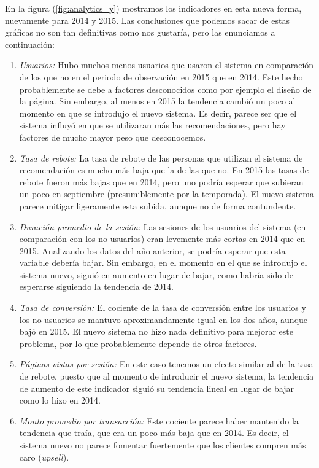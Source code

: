 \documentclass[12pt]{report}
\begin{document}
En la figura (\ref{fig:analytics_y}) mostramos los indicadores en esta nueva forma, nuevamente para 2014 y 2015. Las conclusiones que podemos sacar de estas gráficas no son tan definitivas como nos gustaría, pero las enunciamos a continuación:
\begin{enumerate}
	\item \emph{Usuarios:} Hubo muchos menos usuarios que usaron el sistema en comparación de los que no en el periodo de observación en 2015 que en 2014. Este hecho probablemente se debe a factores desconocidos como por ejemplo el diseño de la página. Sin embargo, al menos en 2015 la tendencia cambió un poco al momento en que se introdujo el nuevo sistema. Es decir, parece ser que el sistema influyó en que se utilizaran más las recomendaciones, pero hay factores de mucho mayor peso que desconocemos.
	\item \emph{Tasa de rebote:} La tasa de rebote de las personas que utilizan el sistema de recomendación es mucho más baja que la de las que no. En 2015 las tasas de rebote fueron más bajas que en 2014, pero uno podría esperar que subieran un poco en septiembre (presumiblemente por la temporada). El nuevo sistema parece mitigar ligeramente esta subida, aunque no de forma contundente.
	\item \emph{Duración promedio de la sesión:} Las sesiones de los usuarios del sistema (en comparación con los no-usuarios) eran levemente más cortas en 2014 que en 2015. Analizando los datos del año anterior, se podría esperar que esta variable debería bajar. Sin embargo, en el momento en el que se introdujo el sistema nuevo, siguió en aumento en lugar de bajar, como habría sido de esperarse siguiendo la tendencia de 2014.
	\item \emph{Tasa de conversión:} El cociente de la tasa de conversión entre los usuarios y los no-usuarios se mantuvo aproximandamente igual en los dos años, aunque bajó en 2015. El nuevo sistema no hizo nada definitivo para mejorar este problema, por lo que probablemente depende de otros factores.
	\item \emph{Páginas vistas por sesión:} En este caso tenemos un efecto similar al de la tasa de rebote, puesto que al momento de introducir el nuevo sistema, la tendencia de aumento de este indicador siguió su tendencia lineal en lugar de bajar como lo hizo en 2014.
	\item \emph{Monto promedio por transacción:} Este cociente parece haber mantenido la tendencia que traía, que era un poco más baja que en 2014. Es decir, el sistema nuevo no parece fomentar fuertemente que los clientes compren más caro (\emph{upsell}).
\end{enumerate}
\end{document}
